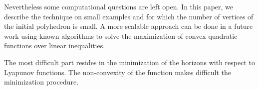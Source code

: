 \documentclass[10pt]{article}
\begin{document}
Nevertheless some computational questions are left open. In this paper, we describe the technique on small examples and for which the number of vertices of the initial polyhedron is small. A more scalable approach can be done in a future work using known algorithms to solve the maximization of convex quadratic functions over linear inequalities. 

The most  difficult part resides in the minimization of the horizons with respect to Lyapunov functions. The non-convexity of the function makes difficult the minimization procedure.         

 
\end{document}
